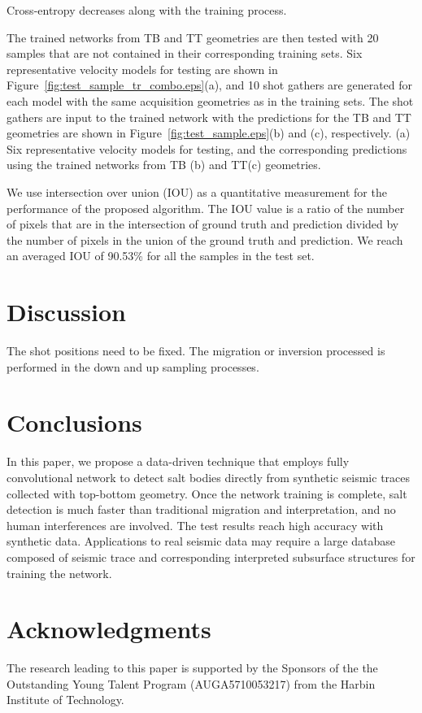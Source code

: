 \documentclass{segabs}
\begin{document}
{Cross-entropy decreases along with the training process.}

The trained networks from TB and TT geometries are then tested with 20 samples that are not contained in their corresponding training sets. Six representative velocity models for testing are shown in Figure~\ref{fig:test_sample_tr_combo.eps}(a), and 10 shot gathers are generated for each model with the same acquisition geometries as in the training sets. The shot gathers are input to the trained network with the predictions for the TB and TT geometries are shown in Figure~\ref{fig:test_sample.eps}(b) and (c), respectively.
{(a) Six representative velocity models for testing, and the corresponding predictions using the trained networks from TB (b) and TT(c) geometries.}

We use intersection over union (IOU) as a quantitative measurement for the performance of the proposed algorithm. The IOU value is a ratio of the number of pixels that are in the intersection of ground truth and prediction divided by the number of pixels in the union of the ground truth and prediction.
We reach an averaged IOU of 90.53\% for all the samples in the test set.
\section{Discussion}
The shot positions need to be fixed.
The migration or inversion processed is performed in the down and up sampling processes. 


\section{Conclusions}
In this paper, we propose a data-driven technique that employs fully convolutional network to detect salt bodies directly from synthetic seismic traces collected with top-bottom geometry. Once the network training is complete, salt detection is much faster than traditional migration and interpretation, and no human interferences are involved. The test results reach high accuracy with synthetic data. Applications to real seismic data may require a large database composed of seismic trace and corresponding interpreted subsurface structures for training the network.


\section{Acknowledgments}

The research leading to this paper is supported by the Sponsors of the
the Outstanding Young Talent Program (AUGA5710053217) from the Harbin Institute of Technology. 

\newpage


\end{document}
